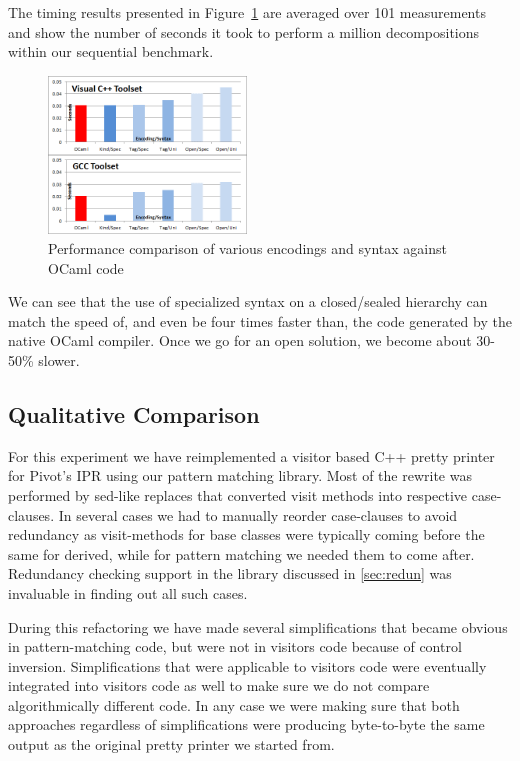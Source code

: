 \documentclass[preprint]{sigplanconf}
\begin{document}
\noindent
The timing results presented in Figure~\ref{fig:OCamlComparison} are averaged 
over 101 measurements and show the number of seconds it took to perform a 
million decompositions within our sequential benchmark.

\begin{figure}[htbp]
  \centering
    \includegraphics[width=0.47\textwidth]{OCamlComparison.png}
  \caption{Performance comparison of various encodings and syntax against OCaml code}
  \label{fig:OCamlComparison}
\end{figure}

We can see that the use of specialized syntax on a closed/sealed hierarchy can 
match the speed of, and even be four times faster than, the code generated by 
the native OCaml compiler. Once we go for an open solution, we become about 
30-50\% slower. 

\subsection{Qualitative Comparison}
\label{sec:qualcmp}

For this experiment we have reimplemented a visitor based C++ pretty printer for 
Pivot's IPR using our pattern matching library. Most of the rewrite was 
performed by sed-like replaces that converted visit methods into respective 
case-clauses. In several cases we had to manually reorder case-clauses to avoid 
redundancy as visit-methods for base classes were typically coming before the 
same for derived, while for pattern matching we needed them to come after. 
Redundancy checking support in the library discussed in \textsection\ref{sec:redun}
was invaluable in finding out all such cases.

During this refactoring we have made several simplifications that became obvious 
in pattern-matching code, but were not in visitors code because of control 
inversion. Simplifications that were applicable to visitors code were eventually 
integrated into visitors code as well to make sure we do not compare 
algorithmically different code. In any case we were making sure that both 
approaches regardless of simplifications were producing byte-to-byte the same 
output as the original pretty printer we started from.
\end{document}
